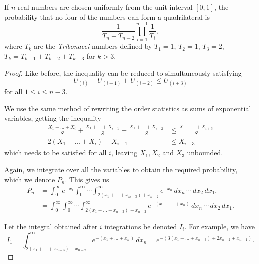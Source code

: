 \documentclass[10pt,a4paper]{amsart}
\begin{document}
\begin{theorem}
  If \(n\) real numbers are chosen uniformly from the unit interval \([0, 1]\), the probability that no four of the numbers can form a quadrilateral is \[
    \frac{1}{T_n - T_{n-2}} \prod_{i = 1}^{n-1} \frac{1}{T_i}
  ,\] where \(T_k\) are the \emph{Tribonacci} numbers defined by \(T_1 = 1\), \(T_2 = 1\), \(T_3 = 2\), \(T_{k} = T_{k-1} + T_{k-2} + T_{k-3}\) for \(k > 3\).
\end{theorem}

\begin{proof}
  Like before, the inequality can be reduced to simultaneously satisfying \[
    U_{(i)} + U_{(i+1)} + U_{(i+2)} \le U_{(i+3)}
  \] for all $1 \le i \le n-3$.

  We use the same method of rewriting the order statistics as sums of exponential variables, getting the inequality
  \begin{align*}
    \frac{X_1 + \dots + X_{i}}{S} + \frac{X_1 + \dots + X_{i+1}}{S} + \frac{X_1 + \dots + X_{i+2}}{S} &\le \frac{X_1 + \dots + X_{i+3}}{S} \\
    2(X_1 + \dots + X_i) + X_{i+1} &\le X_{i+3}
  \end{align*}
  which needs to be satisfied for all $i$, leaving $X_1, X_2$ and $X_3$ unbounded.

  Again, we integrate over all the variables to obtain the required probability, which we denote $P_n$. This gives us
  \begin{align*}
    P_n &= \int_{0}^{\infty} e^{-x_1}\int_{0}^{\infty} \dotsi \int_{2(x_1 + \dots + x_{n-3}) + x_{n-2}}^{\infty} e^{-x_n}\, dx_n\, \cdots\, dx_2\, dx_1, \\
        &= \int_{0}^{\infty} \int_{0}^{\infty} \dotsi \int_{2(x_1 + \dots + x_{n-3}) + x_{n-2}}^{\infty} e^{-(x_1 + \dots + x_n)}\, dx_n \, \cdots \, dx_2 \, dx_1.
  \end{align*}

  Let the integral obtained after $i$ integrations be denoted $I_i$. For example, we have \[
    I_1 = \int_{2(x_1+\dots+x_{n-3})+x_{n-2}}^{\infty} e^{-(x_1+\dots+x_n)}\, dx_n = e^{-(3(x_1+\dots+x_{n-3})+2x_{n-2}+x_{n-1})}
  .\]


\end{proof}
\end{document}
